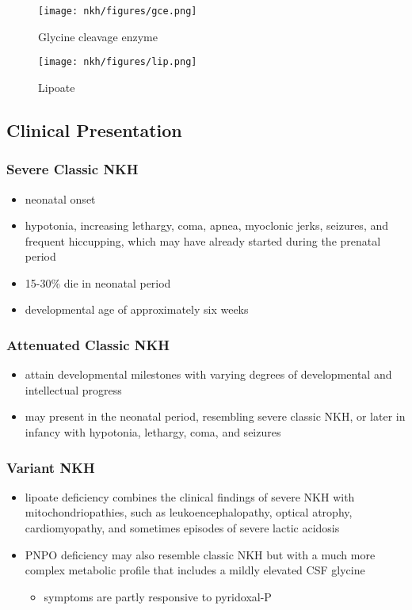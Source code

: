 \documentclass{scrartcl}
\begin{document}
\begin{figure}[htbp]
\centering
\texttt{[image: nkh/figures/gce.png]}
\caption{\label{fig:org003fb9e}Glycine cleavage enzyme}
\end{figure}

\begin{figure}[htbp]
\centering
\texttt{[image: nkh/figures/lip.png]}
\caption{\label{fig:org504af8e}Lipoate}
\end{figure}

\subsection{Clinical Presentation}
\label{sec:org5c07fdd}
\subsubsection{Severe Classic NKH}
\label{sec:orgd1e8310}
\begin{itemize}
\item neonatal onset
\item hypotonia, increasing lethargy, coma, apnea, myoclonic jerks,
seizures, and frequent hiccupping, which may have already started
during the prenatal period
\item 15-30\% die in neonatal period
\item developmental age of approximately six weeks
\end{itemize}

\subsubsection{Attenuated Classic NKH}
\label{sec:orge28eea1}
\begin{itemize}
\item attain developmental milestones with varying degrees of
developmental and intellectual progress
\item may present in the neonatal period, resembling severe classic NKH,
or later in infancy with hypotonia, lethargy, coma, and seizures
\end{itemize}
\subsubsection{Variant NKH}
\label{sec:orgab292fb}
\begin{itemize}
\item lipoate deficiency combines the clinical findings of severe NKH with
mitochondriopathies, such as leukoencephalopathy, optical atrophy,
cardiomyopathy, and sometimes episodes of severe lactic acidosis
\item PNPO deficiency may also resemble classic NKH but with a much more
complex metabolic profile that includes a mildly elevated CSF
glycine
\begin{itemize}
\item symptoms are partly responsive to pyridoxal-P
\end{itemize}
\end{itemize}
\end{document}
